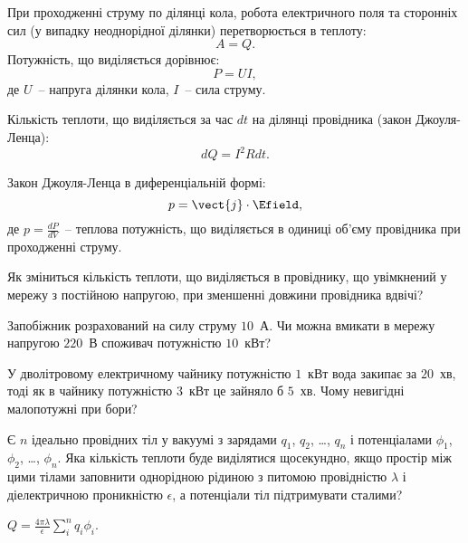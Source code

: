 \begin{Theory}\small
    При проходженні струму по ділянці кола, робота електричного поля та сторонніх сил (у випадку неоднорідної ділянки) перетворюється в теплоту:
	\begin{equation}
		A = Q.
\end{equation}
Потужність, що виділяється дорівнює:
\begin{equation}
		P = U I,
\end{equation}
де $U$~-- напруга ділянки кола, $I$~-- сила струму.

Кількість теплоти, що виділяється за час $dt$ на ділянці провідника (закон Джоуля-Ленца):
\begin{equation}
	dQ = I^2 R dt.
\end{equation}

Закон Джоуля-Ленца в диференціальній формі:
\begin{equation}
p = \vect{j}\cdot\Efield,
\end{equation}
де $p = \frac{dP}{dV}$~-- теплова потужність, що виділяється в одиниці об'єму провідника при проходженні струму.
\end{Theory}

\begin{problem}
    Як зміниться кількість теплоти, що виділяється в провіднику, що увімкнений у мережу з постійною напругою, при зменшенні довжини провідника вдвічі?
\end{problem}

\begin{problem}
    Запобіжник розрахований на силу струму $10$~А. Чи можна вмикати в мережу напругою $220$~В споживач потужністю $10$~кВт?
\end{problem}


\begin{problem}
    У дволітровому електричному чайнику потужністю $1$~кВт вода закипає за $20$~хв, тоді як в чайнику потужністю $3$~кВт це зайняло б $5$~хв. Чому невигідні малопотужні при бори?
\end{problem}


\begin{problem}%
Є $n$ ідеально провідних тіл у вакуумі з зарядами $q_1$, $q_2$, \ldots, $q_n$ і потенціалами $\phi_1$, $\phi_2$, \ldots, $\phi_n$. Яка кількість теплоти буде виділятися щосекундно, якщо простір між цими тілами заповнити однорідною рідиною з питомою провідністю $\lambda$ і діелектричною проникністю $\epsilon$, а потенціали тіл підтримувати сталими?
\begin{solution}
	$Q = \frac{4\pi\lambda}{\epsilon}\sum\limits_i^n q_i\phi_i$.
\end{solution}
\end{problem}

